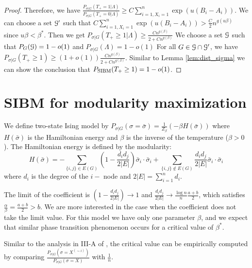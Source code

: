 \documentclass{article}
\begin{document}
\begin{proof}
	Therefore, we have $\frac{P_{\sigma | G}(T_+ = 1 | \Lambda ) }{P_{\sigma | G}(T_+ = 0 | \Lambda )} \geq C\sum_{i=1, X_i=1}^n \exp(u(B_i - A_i))$.
	We can choose a set $\mathcal{G}'$ such that $C\sum_{i=1, X_i=1}^n \exp(u(B_i - A_i)) > \frac{C}{2}n^{g(u\beta)}$ since $u\beta < \beta^*$.
	Then we get $P_{\sigma | G}(T_+\geq 1 | \Lambda) \geq \frac{Cn^{g(\beta)}}{2 + C n^{g(\beta)}} $
	We choose a set $\mathcal{G}$ such that $P_G(\mathcal{G}) = 1-o(1)$ and
	$ P_{\sigma|G} (\Lambda)
	=1- o(1)
	$
	For all $G \in \mathcal{G} \cap \mathcal{G}'$, we have $P_{\sigma | G}(T_+ \geq 1) \geq (1+o(1)) \frac{Cn^{g(\beta)}}{2 + C n^{g(\beta)}}$.
	Similar to Lemma \ref{lem:dist_sigma} we can show the conclusion that $P_{\operatorname{SIBM}}(T_+ \geq 1) = 1-o(1)$.
\end{proof}
\section{SIBM for modularity maximization}
We define two-state Ising model by $P_{\sigma | G}(\sigma=\bar{\sigma}) = \frac{1}{Z_{\beta}}(-\beta H(\bar{\sigma}))$
where $H(\bar{\sigma})$ is the Hamiltonian energy and $\beta$ is the inverse of the temperature ($\beta>0$).
The Hamiltonian energy is defined by the modularity:
\begin{equation}
H(\bar{\sigma}) = - \sum_{\{i,j\} \in E(G) } (1-\frac{d_id_j}{2|E|} )\bar{\sigma}_i \cdot \bar{\sigma}_i + \sum_{\{i,j\} \not\in E(G) }\frac{d_id_j}{2|E|}  \bar{\sigma}_i \cdot \bar{\sigma}_i
\end{equation}
where $d_i$ is the degree of the $i-$ node and $2|E|=\sum_{i=1}^n d_i$.

The limit of the coefficient is $(1-\frac{d_id_j}{2|E|} ) \to 1$ and $\frac{d_id_j}{2|E|} \to \frac{\log n}{n} \frac{a+b}{2}$, which satisfies
$\frac{\alpha}{\beta}  = \frac{a+b}{2} > b$. We are more interested in the case when the coefficient does not take the limit value.
For this model we have only one parameter $\beta$, and we expect that similar phase transition phenomenon occurs for a critical value of $\beta^*$.

Similar to the analysis in III-A of \cite{ye2020exact}, the critical value can be empirically computed by comparing
$\frac{P_{\sigma | G}(\sigma = X^{(\sim i)})}{P_{\sigma |G}(\sigma = X)}$ with $\frac{1}{n}$.
\end{document}
